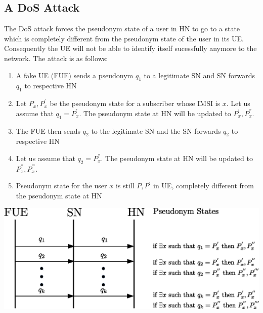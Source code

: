 \documentclass[portrait,a0]{a0poster}
\begin{document}
\begin{multicols}{2}
\section{A D\MakeLowercase{o}S Attack}
The DoS attack forces the pseudonym state of a user in HN to go to a state which is completely different from the pseudonym state of the user in its UE. Consequently the UE will not be able to identify itself sucessfully anymore to the network. The attack is as follows:
\begin{enumerate}
\item \label{send_fake_pseudonym} A fake UE (FUE) sends a pseudonym $q_1$ to a legitimate SN and SN forwards $q_1$ to respective HN
\item \label{q_equal_pseudonym} Let $P_x,P_x^{'}$ be the pseudonym state for a subscriber whose IMSI is $x$. Let us assume that $q_1=P_x^{'}$. The pseudonym state at HN will be updated to $P_x^{'},P_x^{''}$.
\item The FUE then sends $q_2$ to the legitimate SN and the SN forwards $q_2$ to respective HN
\item Let us assume that $q_2=P_x^{''}$. The pseudonym state at HN will be updated to $P_x^{''},P_x^{'''}$.
\item Pseudonym state for the user $x$ is still $P,P^{'}$ in UE, completely different from the pseudonym state at HN
\end{enumerate}

\begin{center}
\begin{minipage}[t]{0.9\linewidth} %
\vspace{.5cm} %
\includegraphics[width=1\linewidth]{attack.eps}
\hspace{0pt}
\vspace{.5cm} %
\end{minipage} 
\end{center}


\end{multicols}
\end{document}
